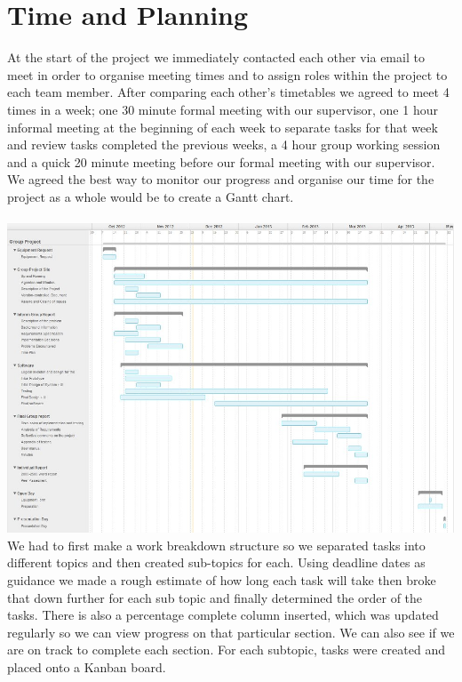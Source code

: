 \documentclass[10pt,a4paper]{article}
\begin{document}
\section{Time and Planning}
At the start of the project we immediately contacted each other via email to meet in order to organise meeting times and to assign roles within the project to each team member. After comparing each other’s timetables we agreed to meet 4 times in a week; one 30 minute formal meeting with our supervisor, one 1 hour informal meeting at the beginning of each week to separate tasks for that week and review tasks completed the previous weeks, a 4 hour group working session and a quick 20 minute meeting before our formal meeting with our supervisor. We agreed the best way to monitor our progress and organise our time for the project as a whole would be to create a Gantt chart.  \\
\\
\includegraphics[scale=0.7, angle=270]{gantt.png}
\pagebreak
\\
We had to first make a work breakdown structure so we separated tasks into different topics and then created sub-topics for each. Using deadline dates as guidance we made a rough estimate of how long each task will take then broke that down further for each sub topic and finally determined the order of the tasks. There is also a percentage complete column inserted, which was updated regularly so we can view progress on that particular section. We can also see if we are on track to complete each section. For each subtopic, tasks were created and placed onto a Kanban board.\\
\\
\end{document}
